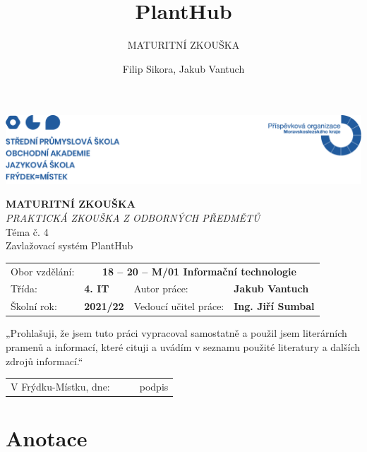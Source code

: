 \documentclass[12pt,a4paper]{article}
\title{PlantHub}
\subtitle{MATURITNÍ ZKOUŠKA }
\author{Filip Sikora, Jakub Vantuch}
\date{}
\begin{document}
\begin{titlepage}
	\noindent\includegraphics[width=\linewidth]{header.png}
	\begin{center}
		\vspace*{0.2cm}
		\Huge\textbf{MATURITNÍ ZKOUŠKA}
		\vspace*{1cm} \\
		\large \emph{PRAKTICKÁ ZKOUŠKA Z ODBORNÝCH PŘEDMĚTŮ}
		\vspace*{1cm} \\
		\Large Téma č. 4 \\
		\vspace*{1cm}
		\Large Zavlažovací systém PlantHub \\
		\vspace*{1.3cm}
		\normalsize
	\end{center}
	\begin{tabularx}{\textwidth}{l@{\hskip 0.5cm}XXl}
		Obor vzdělání:        & \multicolumn{3}{c}{\textbf{18 – 20 –
		M/01
		Informační technologie}}
		\\[10pt]
		Třída:                & \textbf{4. IT}
		                      &
		Autor práce:          & \textbf{Jakub Vantuch}
		\\[10pt]
		Školní rok:           & \textbf{2021/22}
		                      &
		Vedoucí učitel práce: &
		\textbf{Ing. Jiří Sumbal}
		\vspace*{2cm}
	\end{tabularx}
	„Prohlašuji, že jsem tuto práci vypracoval samostatně a použil jsem
	literárních
	pramenů a informací, které cituji a uvádím v seznamu použité literatury
	a
	dalších zdrojů informací.“

	\begin{tabularx}{\textwidth}{l@{\hskip 0.5cm}XXl}
		\\[10pt]
		V Frýdku-Místku, dne:             & \textbf{\dotfill}
		                                  &
		\textbf{\dotfill} & podpis
	\end{tabularx}
\end{titlepage}

\clearpage

\section*{Anotace}
\end{document}
